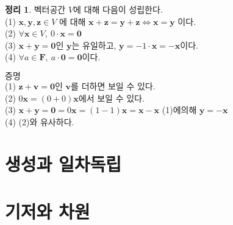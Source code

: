 \documentclass[12pt]{book}
\newcommand{\x}{\mathbf{x}}
\newcommand{\y}{\mathbf{y}}
\newcommand{\z}{\mathbf{z}}
\newcommand{\0}{\mathbf{0}}
\newcommand{\F}{\mathbf{F}}
\theoremstyle{definition}
\newtheorem{thm}{정리}[section]
\begin{document}
\begin{thm}
    벡터공간 $V$에 대해 다음이 성립한다.\\
    (1) $\x, \y, \z \in V$ 에 대해 $\x + \z = \y+ \z \Leftrightarrow \x=\y$ 이다.\\
    (2) $\forall \x \in V, \ 0\cdot \x = \0 $\\
    (3) $\x+\y=\0$인 $\y$는 유일하고, $\y=-1\cdot \x=-\x$이다.\\
    (4) $\forall a \in \F, \ a \cdot \0 = \0$이다.\\
\end{thm}

$\textbf{증명}$\\ 
(1) $\z +\mathbf{v} =\0 $인 $\mathbf{v} $를 더하면 보일 수 있다.\\
(2) $0\x =(0+0)\x $에서 보일 수 있다.\\
(3) $\x +\y =\0 =0\x =(1-1)\x =\x -\x $ (1)에의해 $\y =-\x $\\
(4) (2)와 유사하다.\\



\section{생성과 일차독립}
\section{기저와 차원}
\end{document}
